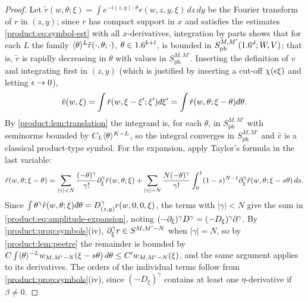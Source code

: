 \begin{proof}
Let $\tilde r(w,\theta;\xi)=\int e^{-i(z,y)\cdot\theta}r(w,z,y,\xi)\,dz\,dy$ be the
Fourier transform of $r$ in $(z,y)$; since $r$ has compact support in $x$ and
satisfies the estimates \eqref{product:eq:symbol-est} with all $x$-derivatives,
integration by parts shows that for each $L$ the family
$\langle \theta\rangle^L\tilde r(\cdot,\theta;\cdot)$, $\theta\in1.6^{k+l}$, is bounded in
$S^{M,M'}_{\mathrm{ph}}(1.6^d;W,V)$; that is, $\tilde r$ is rapidly decreasing in
$\theta$ with values in $S^{M,M'}_{\mathrm{ph}}$. Inserting the definition of $v$ and integrating first in
$(z,y)$ (which is justified by inserting a cut-off $\chi(\epsilon\xi)$ and letting
$\epsilon\to0$),
\begin{equation*}
\hat v(w,\xi)=\int\tilde r(w,\xi-\xi';\xi')\,\dbar\xi'=\int\tilde r(w,\theta;\xi-\theta)
\,\dbar\theta.
\end{equation*}
By \cref{product:lem:translation} the integrand is, for each $\theta$, in
$S^{M,M'}_{\mathrm{ph}}$ with seminorms bounded by $C_L\langle \theta\rangle^{K-L}$, so the
integral converges in $S^{M,M'}_{\mathrm{ph}}$ and $\hat v$ is a classical
product-type symbol. For the expansion, apply Taylor's formula in the last
variable:
\begin{equation*}
\tilde r(w,\theta;\xi-\theta)=\sum_{|\gamma|<N}\frac{(-\theta)^\gamma}{\gamma!}
\partial_\xi^\gamma\tilde r(w,\theta;\xi)+\sum_{|\gamma|=N}\frac{N(-\theta)^\gamma}{\gamma!}
\int_0^1(1-s)^{N-1}\partial_\xi^\gamma\tilde r(w,\theta;\xi-s\theta)\,ds.
\end{equation*}
Since $\int\theta^\gamma\tilde r(w,\theta;\xi)\,\dbar\theta=D^\gamma_{(z,y)}r(w,0,0,\xi)$,
the terms with $|\gamma|<N$ give the sum in \eqref{product:eq:amplitude-expansion},
noting $(-\partial_\xi)^\gamma D^\gamma=(-D_\xi)^\gamma\partial^\gamma$. By
\cref{product:prop:symbols}(iv), $\partial_\xi^\gamma r\in S^{M,M'-N}$ when $|\gamma|=N$,
so by \cref{product:lem:peetre} the remainder is bounded by
$C\int\langle \theta\rangle^{-L}w_{M,M'-N}(\xi-s\theta)\,d\theta\le C'w_{M,M'-N}(\xi)$, and the
same argument applies to its derivatives. The orders of the individual terms
follow from \cref{product:prop:symbols}(iv), since $(-D_\xi)^\gamma$ contains at
least one $\eta$-derivative if $\beta\ne0$.
\end{proof}

